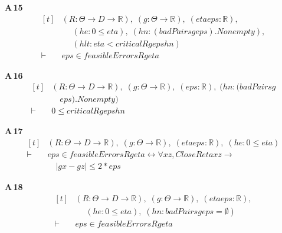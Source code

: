 \noindent\textbf{A\,15}\quad{}
{\footnotesize\[ \begin{aligned}[t]
&(\mathit{R} : \Theta \to \mathit{D} \to \mathbb{R} ),\; (\mathit{g} : \Theta \to \mathbb{R} ),\; (\mathit{eta} \mathit{eps} : \mathbb{R} ),\\
&\quad \; (\mathit{he} : 0 \leq \mathit{eta}),\; (\mathit{hn} : (\mathit{badPairs} \mathit{g} \mathit{eps}).\mathit{Nonempty}),\\
&\quad \; (\mathit{hlt} : \mathit{eta}<\mathit{critical} \mathit{R} \mathit{g} \mathit{eps} \mathit{hn})\\
\vdash\;&\mathit{eps} \in \mathit{feasibleErrors} \mathit{R} \mathit{g} \mathit{eta}
\end{aligned} \]}

\noindent\textbf{A\,16}\quad{}
{\footnotesize\[ \begin{aligned}[t]
&(\mathit{R} : \Theta \to \mathit{D} \to \mathbb{R} ),\; (\mathit{g} : \Theta \to \mathbb{R} ),\; (\mathit{eps} : \mathbb{R} ),\; (\mathit{hn} : (\mathit{badPairs} \mathit{g}\\
&\quad \mathit{eps}).\mathit{Nonempty})\\
\vdash\;&0 \leq \mathit{critical} \mathit{R} \mathit{g} \mathit{eps} \mathit{hn}
\end{aligned} \]}

\noindent\textbf{A\,17}\quad{}
{\footnotesize\[ \begin{aligned}[t]
&(\mathit{R} : \Theta \to \mathit{D} \to \mathbb{R} ),\; (\mathit{g} : \Theta \to \mathbb{R} ),\; (\mathit{eta} \mathit{eps} : \mathbb{R} ),\; (\mathit{he} : 0 \leq \mathit{eta})\\
\vdash\;&\mathit{eps} \in \mathit{feasibleErrors} \mathit{R} \mathit{g} \mathit{eta} \leftrightarrow \forall \mathit{x} \mathit{z},\mathit{Close} \mathit{R} \mathit{eta} \mathit{x} \mathit{z} \to\\
&\quad |\mathit{g} \mathit{x}-\mathit{g} \mathit{z}| \leq 2*\mathit{eps}
\end{aligned} \]}

\noindent\textbf{A\,18}\quad{}
{\footnotesize\[ \begin{aligned}[t]
&(\mathit{R} : \Theta \to \mathit{D} \to \mathbb{R} ),\; (\mathit{g} : \Theta \to \mathbb{R} ),\; (\mathit{eta} \mathit{eps} : \mathbb{R} ),\\
&\quad \; (\mathit{he} : 0 \leq \mathit{eta}),\; (\mathit{hn} : \mathit{badPairs} \mathit{g} \mathit{eps}=\emptyset )\\
\vdash\;&\mathit{eps} \in \mathit{feasibleErrors} \mathit{R} \mathit{g} \mathit{eta}
\end{aligned} \]}

